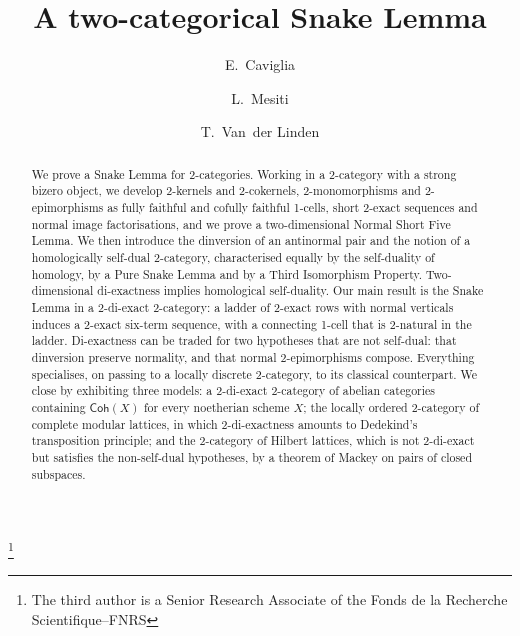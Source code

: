 \documentclass[reqno,a4paper]{amsart}
\numberwithin{equation}{section}
\theoremstyle{plain}
\theoremstyle{definition}
\newcommand{\onecat}[1]{\ensuremath{\mathsf{#1}}\xspace}
\renewcommand{\1}{\onecat{1}}
\newcommand{\Coh}{\onecat{Coh}}
\begin{document}
\title{A two-categorical Snake Lemma}

\author{E.~Caviglia}
\address[E.~Caviglia]{Department of Mathematical Sciences, Stellenbosch University, South Africa}
\address[E.~Caviglia]{National Institute for Theoretical and Computational Sciences (NITheCS), Stellenbosch, South Africa}

\author{L.~Mesiti}
\address[L.~Mesiti]{Department of Mathematical Sciences, Stellenbosch University, South Africa}

\author{T.~Van~der Linden}
\address[T.~Van~der Linden]{Institut de Recherche en Math\'ematique et Physique, Universit\'e catholique de Louvain, che\-min du cyclotron~2 bte~L7.01.02, B--1348 Louvain-la-Neuve, Belgium}
\address[T.~Van~der Linden]{Mathematics \& Data Science, Vrije Universiteit Brussel, Pleinlaan 2, B--1050 Brussel, Belgium}


\thanks{The third author is a Senior Research Associate of the Fonds de la Recherche Scientifique--FNRS}

\date{}



\begin{abstract}
	We prove a Snake Lemma for 2-categories. Working in a 2-category with a strong bizero object, we develop 2-kernels and 2-cokernels, 2-monomorphisms and 2-epimorphisms as fully faithful and cofully faithful 1-cells, short 2-exact sequences and normal image factorisations, and we prove a two-dimensional Normal Short Five Lemma. We then introduce the dinversion of an antinormal pair and the notion of a homologically self-dual 2-category, characterised equally by the self-duality of homology, by a Pure Snake Lemma and by a Third Isomorphism Property. Two-dimensional di-exactness implies homological self-duality. Our main result is the Snake Lemma in a 2-di-exact 2-category: a ladder of 2-exact rows with normal verticals induces a 2-exact six-term sequence, with a connecting 1-cell that is 2-natural in the ladder. Di-exactness can be traded for two hypotheses that are not self-dual: that dinversion preserve normality, and that normal 2-epimorphisms compose. Everything specialises, on passing to a locally discrete 2-category, to its classical counterpart. We close by exhibiting three models: a 2-di-exact 2-category of abelian categories containing \(\Coh(X)\) for every noetherian scheme \(X\); the locally ordered 2-category of complete modular lattices, in which 2-di-exactness amounts to Dedekind's transposition principle; and the 2-category of Hilbert lattices, which is not 2-di-exact but satisfies the non-self-dual hypotheses, by a theorem of Mackey on pairs of closed subspaces.
\end{abstract}
\end{document}

